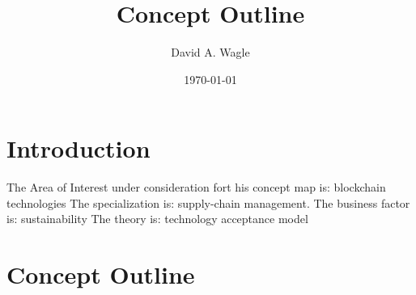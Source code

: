 \documentclass[man]{apa7}
\affiliation{North Central University}
\author{David A. Wagle}
\date{\today}
\title{Concept Outline}
\begin{document}
\maketitle



\section{Introduction}
\label{sec:orgade3fe1}

The Area of Interest under consideration fort his concept map is: blockchain technologies
The specialization is: supply-chain management.
The business factor is: sustainability
The theory is: technology acceptance model

\section{Concept Outline}
\label{sec:org0a41ec4}
\end{document}
